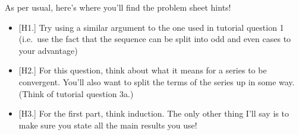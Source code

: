\documentclass[
  12pt,
  a4paper]{extarticle}
\providecommand{\tightlist}{%
  \setlength{\itemsep}{0pt}\setlength{\parskip}{0pt}}
\theoremstyle{plain}
\theoremstyle{plain}
\theoremstyle{plain}
\theoremstyle{plain}
\theoremstyle{plain}
\theoremstyle{definition}
\theoremstyle{definition}
\theoremstyle{definition}
\theoremstyle{remark}
\renewcommand{\;}{\,}
\begin{document}
As per usual, here's where you'll find the problem sheet hints!

\begin{itemize}
\tightlist
\item
  {[}H1.{]} Try using a similar argument to the one used in tutorial question 1 (i.e.~use the fact that the sequence can be split into odd and even cases to your advantage)
\item
  {[}H2.{]} For this question, think about what it means for a series to be convergent. You'll also want to split the terms of the series up in some way. (Think of tutorial question 3a.)
\item
  {[}H3.{]} For the first part, think induction. The only other thing I'll say is to make sure you state all the main results you use!
\end{itemize}
\end{document}
